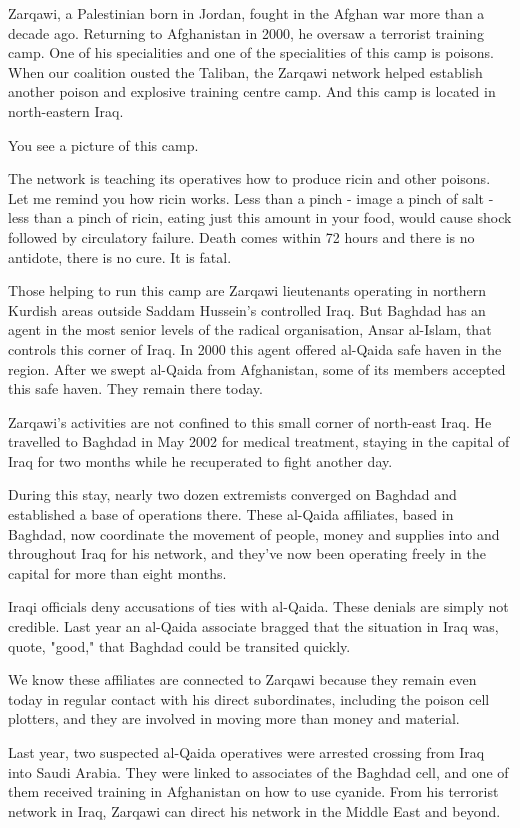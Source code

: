 \documentclass[10pt,a4paper]{article}
\begin{document}
Zarqawi, a Palestinian born in Jordan, fought in the Afghan war more than a decade ago. Returning to Afghanistan in 2000, he oversaw a terrorist training camp. One of his specialities and one of the specialities of this camp is poisons. When our coalition ousted the Taliban, the Zarqawi network helped establish another poison and explosive training centre camp. And this camp is located in north-eastern Iraq.

You see a picture of this camp.

The network is teaching its operatives how to produce ricin and other poisons. Let me remind you how ricin works. Less than a pinch - image a pinch of salt - less than a pinch of ricin, eating just this amount in your food, would cause shock followed by circulatory failure. Death comes within 72 hours and there is no antidote, there is no cure. It is fatal.

Those helping to run this camp are Zarqawi lieutenants operating in northern Kurdish areas outside Saddam Hussein's controlled Iraq. But Baghdad has an agent in the most senior levels of the radical organisation, Ansar al-Islam, that controls this corner of Iraq. In 2000 this agent offered al-Qaida safe haven in the region. After we swept al-Qaida from Afghanistan, some of its members accepted this safe haven. They remain there today.

Zarqawi's activities are not confined to this small corner of north-east Iraq. He travelled to Baghdad in May 2002 for medical treatment, staying in the capital of Iraq for two months while he recuperated to fight another day.

During this stay, nearly two dozen extremists converged on Baghdad and established a base of operations there. These al-Qaida affiliates, based in Baghdad, now coordinate the movement of people, money and supplies into and throughout Iraq for his network, and they've now been operating freely in the capital for more than eight months.

Iraqi officials deny accusations of ties with al-Qaida. These denials are simply not credible. Last year an al-Qaida associate bragged that the situation in Iraq was, quote, "good," that Baghdad could be transited quickly.

We know these affiliates are connected to Zarqawi because they remain even today in regular contact with his direct subordinates, including the poison cell plotters, and they are involved in moving more than money and material.

Last year, two suspected al-Qaida operatives were arrested crossing from Iraq into Saudi Arabia. They were linked to associates of the Baghdad cell, and one of them received training in Afghanistan on how to use cyanide. From his terrorist network in Iraq, Zarqawi can direct his network in the Middle East and beyond.
\end{document}
